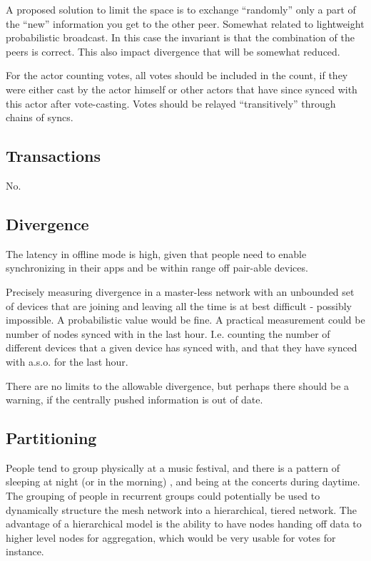 \documentclass[11pt,a4paper]{report}
\begin{document}
A proposed solution to limit the space is to exchange ``randomly'' only a part of the ``new'' information you get to the other peer. Somewhat related to lightweight probabilistic broadcast. In this case the invariant is that the combination of  the peers is correct. This also impact divergence that will be somewhat reduced.

For the actor counting votes, all votes should be included in the count, if they were either cast by the actor himself or other actors that have since synced with this actor after vote-casting. Votes should be relayed ``transitively'' through chains of syncs.

\subsection{Transactions}
No.

\subsection{Divergence}
The latency in offline mode is high, given that people need to enable synchronizing in their apps and be within range off pair-able devices.

Precisely measuring divergence in a master-less network with an unbounded set of devices that are joining and leaving all the time is at best difficult - possibly impossible. A probabilistic value would be fine.
A practical measurement could be number of nodes synced with in the last hour. I.e. counting the number of different devices that a given device has synced with, and that they have synced with a.s.o. for the last hour.

There are no limits to the allowable divergence, but perhaps there should be a warning, if the centrally pushed information is out of date.

\subsection{Partitioning}
People tend to group physically at a music festival, and there is a pattern of sleeping at night (or in the morning) , and being at the concerts during daytime.
The grouping of people in recurrent groups could potentially be used to dynamically structure the mesh network into a hierarchical, tiered network.
The advantage of a hierarchical model is the ability to have nodes handing off data to higher level nodes for aggregation, which would be very usable for votes for instance.
\end{document}
